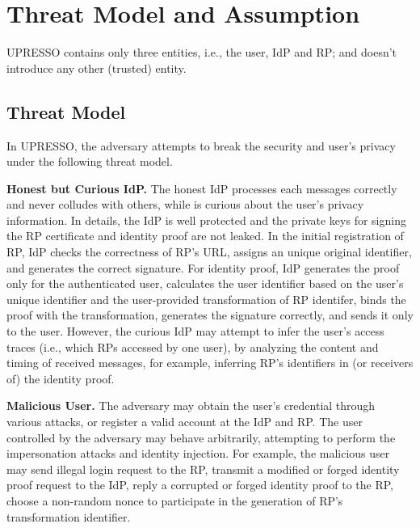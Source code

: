 \section{Threat Model and Assumption}
\label{sec:assumptionandthreatmodel}
UPRESSO contains only three entities, i.e., the user, IdP and RP; and doesn't introduce any other (trusted) entity.


\subsection{Threat Model}
In UPRESSO, the adversary attempts to break the security and user's privacy under the following threat model.

\textbf{Honest but Curious IdP.}
The honest IdP processes each messages correctly and never colludes with others, while is curious about the user's privacy information.
In details, the IdP is well protected and the private keys for signing the RP certificate and identity proof are not leaked.
In the initial registration of RP,  IdP checks the correctness of RP's URL,  assigns an unique original identifier, and generates the correct signature.
For identity proof, IdP generates the proof only for the authenticated user, calculates the user identifier based on the user's unique identifier
and the user-provided transformation of RP identifer, binds the proof with the transformation, generates the signature correctly,
and sends it only to the user.
However, the curious IdP may attempt to infer the user's access traces (i.e., which RPs accessed by one user),
by analyzing the content and timing of received messages, for example, inferring RP's identifiers in (or receivers of) the identity proof.

\textbf{Malicious User.} %
The adversary may obtain the user's credential through various attacks, or register a valid account at the IdP and RP.
The user controlled by the adversary may behave arbitrarily, attempting to perform the impersonation attacks and identity injection.
For example, the malicious user  may send illegal login request to the RP,
transmit a modified or forged identity proof request to the IdP,
reply a corrupted or forged identity proof to the RP,
 choose a non-random nonce to participate in the generation of RP's transformation identifier.

